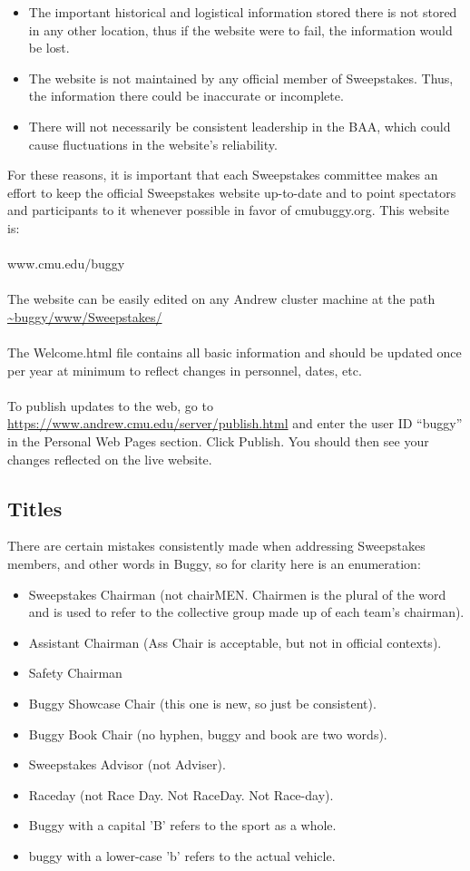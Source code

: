 \begin{itemize}
\item The important historical and logistical information stored there is
  not stored in any other location, thus if the website were to fail,
  the information would be lost.
\item The website is not maintained by any official member of Sweepstakes.
  Thus, the information there could be inaccurate or incomplete.
\item There will not necessarily be consistent leadership in the BAA,
  which could cause fluctuations in the website's reliability.
\end{itemize}

For these reasons, it is important that each Sweepstakes committee makes
an effort to keep the official Sweepstakes website up-to-date and to point
spectators and participants to it whenever possible in favor of cmubuggy.org.
This website is:
\\\\
www.cmu.edu/buggy
\\\\
The website can be easily edited on any Andrew cluster machine at the path
\url{~buggy/www/Sweepstakes/}
\\\\
The Welcome.html file contains all basic information and should be updated
once per year at minimum to reflect changes in personnel, dates, etc.
\\\\
To publish updates to the web, go to
\url{https://www.andrew.cmu.edu/server/publish.html}
and enter the user ID ``buggy'' in the Personal Web Pages section.
Click Publish.
You should then see your changes reflected on the live website.

\subsection{Titles}
\label{subsec:Titles}
There are certain mistakes consistently made when addressing Sweepstakes
members, and other words in Buggy, so for clarity here is an enumeration:

\begin{itemize}
\item Sweepstakes Chairman (not chairMEN. Chairmen is the plural of the word
and is used to refer to the collective group made up of each team's chairman).
\item Assistant Chairman (Ass Chair is acceptable, but not in official
  contexts).
\item Safety Chairman
\item Buggy Showcase Chair (this one is new, so just be consistent).
\item Buggy Book Chair (no hyphen, buggy and book are two words).
\item Sweepstakes Advisor (not Adviser).
\item Raceday (not Race Day. Not RaceDay. Not Race-day).
\item Buggy with a capital 'B' refers to the sport as a whole.
\item buggy with a lower-case 'b' refers to the actual vehicle.
\end{itemize}

